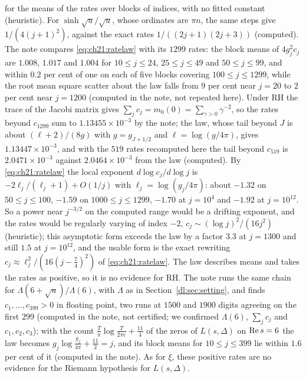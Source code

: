 for the means of the rates over blocks of indices, with no fitted constant (heuristic). For $\sinh\sqrt u/\sqrt u$, whose ordinates are $\pi n$, the same steps give $1/(4(j+1)^2)$, against the exact rates $1/((2j+1)(2j+3))$ (computed). The note compares \eqref{eq:ch21:ratelaw} with its $1299$ rates: the block means of $4g_j^2c_j$ are $1.008$, $1.017$ and $1.004$ for $10\le j\le24$, $25\le j\le49$ and $50\le j\le99$, and within $0.2$ per cent of one on each of five blocks covering $100\le j\le1299$, while the root mean square scatter about the law falls from $9$ per cent near $j=20$ to $2$ per cent near $j=1200$ (computed in the note, not repeated here). Under RH the trace of the Jacobi matrix gives $\sum_jc_j=m_0(0)=\sum_{\gamma>0}\gamma^{-2}$, so the rates beyond $c_{1299}$ sum to $1.13455\times10^{-3}$ by the note; the law, whose tail beyond $J$ is about $(\ell+2)/(8g)$ with $g=g_{J+1/2}$ and $\ell=\log(g/4\pi)$, gives $1.13447\times10^{-3}$, and with the $519$ rates recomputed here the tail beyond $c_{519}$ is $2.0471\times10^{-3}$ against $2.0464\times10^{-3}$ from the law (computed). By \eqref{eq:ch21:ratelaw} the local exponent $d\log c_j/d\log j$ is $-2\ell_j/(\ell_j+1)+O(1/j)$ with $\ell_j=\log(g_j/4\pi)$: about $-1.32$ on $50\le j\le100$, $-1.59$ on $1000\le j\le1299$, $-1.70$ at $j=10^4$ and $-1.92$ at $j=10^{12}$. So a power near $j^{-3/2}$ on the computed range would be a drifting exponent, and the rates would be regularly varying of index $-2$, $c_j\sim(\log j)^2/(16j^2)$ (heuristic); this asymptotic form exceeds the law by a factor $3.3$ at $j=1300$ and still $1.5$ at $j=10^{12}$, and the usable form is the exact rewriting $c_j\approx\ell_j^2/(16(j-\frac74)^2)$ of \eqref{eq:ch21:ratelaw}. The law describes means and takes the rates as positive, so it is no evidence for RH. The note runs the same chain for $\Lambda(6+\sqrt u)/\Lambda(6)$, with $\Lambda$ as in Section~\ref{dl:sec:setting}, and finds $c_1,\dots,c_{399}>0$ in floating point, two runs at $1500$ and $1900$ digits agreeing on the first $299$ (computed in the note, not certified; we confirmed $\Lambda(6)$, $\sum_jc_j$ and $c_1,c_2,c_3$); with the count $\frac T\pi\log\frac T{2\pi e}+\frac{11}4$ of the zeros of $L(s,\Delta)$ on $\operatorname{Re} s=6$ the law becomes $g_j\log\frac{g_j}{4\pi}+\frac{11}2=j$, and its block means for $10\le j\le399$ lie within $1.6$ per cent of it (computed in the note). As for $\xi$, these positive rates are no evidence for the Riemann hypothesis for $L(s,\Delta)$.



